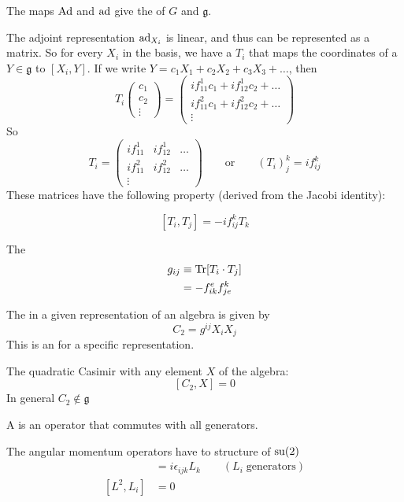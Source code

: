The maps $\operatorname{Ad}$ and $\operatorname{ad}$ give the  of $G$ and $\mathfrak{g}$.

The adjoint representation $\operatorname{ad}_{X_i}$ is linear, and thus can be represented as a matrix. So for every $X_i$ in the basis, we have a $T_i$ that maps the coordinates of a $Y \in \mathfrak{g}$ to $[X_i, Y]$. If we write $Y = c_1X_1 + c_2X_2 + c_3X_3 + \ldots$, then
\[ T_i \begin{pmatrix}
c_1 \\ c_2 \\ \vdots
\end{pmatrix} = \begin{pmatrix}
if^1_{11}c_1 + if^1_{12}c_2 + \hdots \\
if^2_{11}c_1 + if^2_{12}c_2 + \hdots \\
\vdots
\end{pmatrix} \]
So
\[ T_i = \begin{pmatrix}
if^1_{11} & if^1_{12} & \ldots \\
if^2_{11} & if^2_{12} & \ldots \\
\vdots
\end{pmatrix} \qquad \text{or} \qquad \left(T_i\right)^k_j = if^k_{ij}\]
These matrices have the following property (derived from the Jacobi identity):
\begin{eigenschap}
\[ [T_i,T_j] = -if_{ij}^k T_k \]
\end{eigenschap}
 

\begin{definition}
The  
\begin{align}
g_{ij} &\equiv \operatorname{Tr}[T_i\cdot T_j] \\
&=-f_{ik}^ef_{je}^k
\end{align}
\end{definition}

\begin{definition}
The  in a given representation of an algebra is given by
\[ C_2 = g^{ij}X_iX_j \]
This is an  for a specific representation.
\end{definition}

\begin{eigenschap}
The quadratic Casimir  with any element $X$ of the algebra:
\[ [C_2,X] = 0 \]
In general $C_2 \notin \mathfrak{g}$
\end{eigenschap}
A  is an operator that commutes with all generators. 
\begin{example}
The angular momentum operators have to structure of $\operatorname{su}(2)$
\begin{align}
[L_i,L_j] &= i\epsilon_{ijk}L_k \qquad (L_i \; \text{generators}) \\
[L^2, L_i] &= 0
\end{align}
\end{example}

